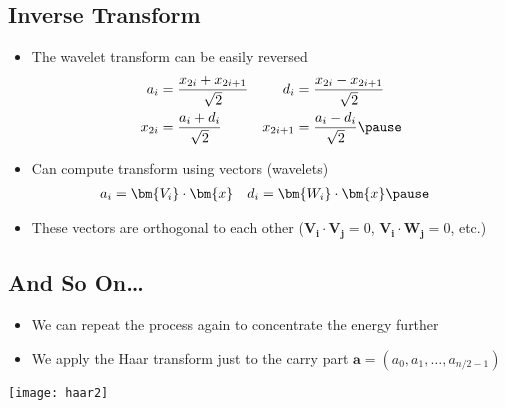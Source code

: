 
\begin{slide}
\section{Inverse Transform}

\begin{PauseHighLight}
  \begin{itemize}
  \item The wavelet transform can be easily reversed
    {\small
      \begin{align*}
        a_i &= \frac{x_{2i} + x_{2i+1}}{\sqrt{2}} &
        d_i &= \frac{x_{2i} - x_{2i+1}}{\sqrt{2}}
        \\
        x_{2i} &= \frac{a_i + d_i}{\sqrt{2}} &
        x_{2i+1} &= \frac{a_i - d_i}{\sqrt{2}}\pause
      \end{align*}}
  \item Can compute transform using vectors (wavelets)
    \begin{align*}
      a_i &= \bm{V_i} \cdot \bm{x} & d_i &= \bm{W_i}\cdot \bm{x}\pause
    \end{align*}
  \item These vectors are orthogonal to each other ($\bm{V_i} \cdot
    \bm{V_j}=0$, $\bm{V_i} \cdot \bm{W_j}=0$, etc.)\pause
  \end{itemize}
\end{PauseHighLight}

\end{slide}



\begin{slide}
\section[-2]{And So On\ldots}

\begin{PauseHighLight}
  \begin{itemize}
  \item We can repeat the process again to concentrate the energy
    further\pause
  \item We apply the Haar transform just to the carry part $\bm{a} =
    (a_0,a_1,\ldots, a_{n/2-1})$
  \end{itemize}
  \begin{center}
    \texttt{[image: haar2]}\pause
  \end{center}
\end{PauseHighLight}

\end{slide}

